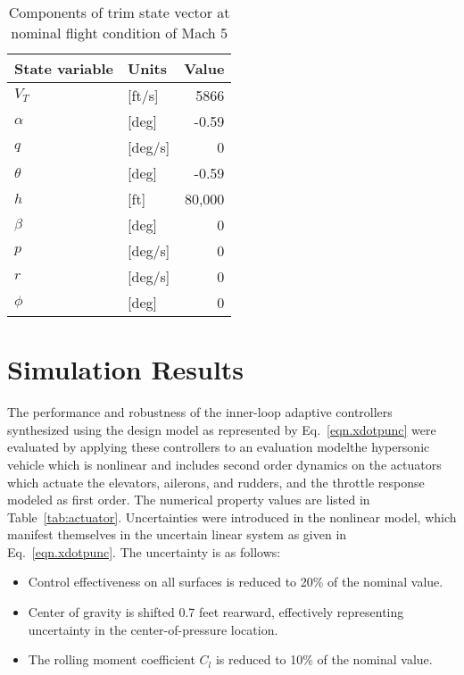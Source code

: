\begin{table}[H]
  \centering
  \caption{Components of trim state vector at nominal flight condition of Mach 5}
  \small
  \begin{tabular}{llr}
    \toprule
    State variable & Units & Value \\ \midrule
    $V_{T}$ & [ft/s] & 5866 \\
    $\alpha$ & [deg] & -0.59 \\
    $q$ & [deg/s] & 0 \\
    $\theta$ & [deg] & -0.59 \\
    $h$ & [ft] & 80,000 \\
    $\beta$ & [deg] & 0 \\
    $p$ & [deg/s] & 0 \\
    $r$ & [deg/s] & 0 \\
    $\phi$ & [deg] & 0 \\ \bottomrule
  \end{tabular}\label{tab:trimstate}
\end{table}

\section{Simulation Results}

The performance and robustness of the inner-loop adaptive controllers synthesized using the design model as represented by Eq.\ \eqref{eqn.xdotpunc} were evaluated by applying these controllers to an evaluation model\textemdash{}the hypersonic vehicle which is nonlinear and includes second order dynamics on the actuators which actuate the elevators, ailerons, and rudders, and the throttle response modeled as first order.
The numerical property values are listed in Table~\ref{tab:actuator}.
Uncertainties were introduced in the nonlinear model, which manifest themselves in the uncertain linear system as given in Eq.\ \eqref{eqn.xdotpunc}.
The uncertainty is as follows:
\begin{itemize}
  \item{Control effectiveness on all surfaces is reduced to 20\% of the nominal value.}
  \item{Center of gravity is shifted 0.7 feet rearward, effectively representing uncertainty in the center-of-pressure location.}
  \item{The rolling moment coefficient $C_{l}$ is reduced to 10\% of the nominal value.}
\end{itemize}

